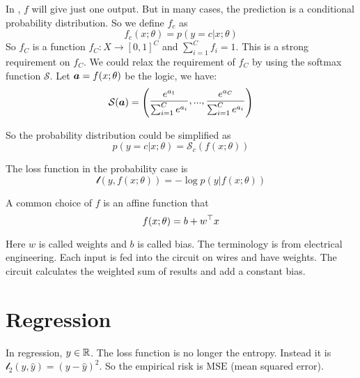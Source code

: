 \begin{definition}
    In , $f$ will give just one output. But in many cases, the prediction is a conditional probability distribution. So we define $f_c$ as
    \begin{equation}
        f_c(x;\theta) = p(y=c|x;\theta)
    \end{equation}
    So $f_C$ is a function $f_C: X \rightarrow [0,1]^C$ and $\displaystyle \sum_{i=1}^C f_i = 1$. This is a strong requirement on $f_C$. We could relax the requirement of $f_C$ by using the softmax function $\mathcal{S}$. Let $\boldsymbol{a} = f(x;\theta)$ be the logic, we have:
    \begin{equation}
        \mathcal{S}(\boldsymbol{a}) = \begin{pmatrix}\displaystyle
            \frac{e^{a_1}}{\sum_{i=1}^C e^{a_i}}, ..., \frac{e^{a_C}}{\sum_{i=1}^C e^{a_i}}
        \end{pmatrix}
    \end{equation}
    
    So the probability distribution could be simplified as
    \begin{equation}
        p(y=c|x;\theta) = \mathcal{S}_c \left(f(x;\theta)\right)
    \end{equation}
    
    The loss function in the probability case is 
    \begin{equation}
        \mathcal{l}(y, f(x;\theta)) = - \log p(y|f(x;\theta))
    \end{equation}
\end{definition}

\begin{example}
    A common choice of $f$ is an affine function that
\begin{equation}
    f(x;\theta) = b + {w}^\top x
\end{equation}

Here $w$ is called weights and $b$ is called bias. The terminology is from electrical engineering. Each input is fed into the circuit on wires and have weights. The circuit calculates the weighted sum of results and add a constant bias.
\end{example}


\section{Regression}

In regression, $y \in \mathbb{R}$. The loss function is no longer the entropy. Instead it is $\mathcal{l}_2 (y, \hat{y}) = (y - \hat{y})^2$. So the empirical risk is $\mathrm{MSE}$ (mean squared error).

